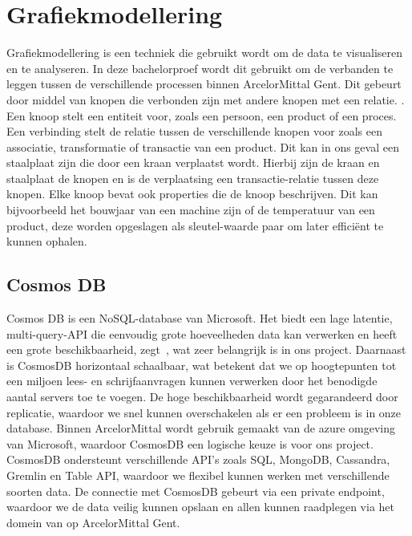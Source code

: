 \label{sec:grafiekmodellering}
\section{Grafiekmodellering}
Grafiekmodellering is een techniek die gebruikt wordt om de data te visualiseren en te analyseren. In deze bachelorproef wordt dit gebruikt om de verbanden te leggen tussen de verschillende processen binnen ArcelorMittal Gent.
Dit gebeurt door middel van knopen die verbonden zijn met andere knopen met een relatie. \autocite{neo4j20252}.
Een knoop stelt een entiteit voor, zoals een persoon, een product of een proces. Een verbinding stelt de relatie tussen de verschillende knopen voor zoals een associatie, transformatie of transactie van een product.
Dit kan in ons geval een staalplaat zijn die door een kraan verplaatst wordt. Hierbij zijn de kraan en staalplaat de knopen en is de verplaatsing een transactie-relatie tussen deze knopen.
Elke knoop bevat ook properties die de knoop beschrijven. Dit kan bijvoorbeeld het bouwjaar van een machine zijn of de temperatuur van een product, deze worden opgeslagen als sleutel-waarde paar om later efficiënt te kunnen ophalen.

\subsection{Cosmos DB}%
Cosmos DB is een NoSQL-database van Microsoft. Het biedt een lage latentie, multi-query-API die eenvoudig grote hoeveelheden data kan verwerken en heeft een grote beschikbaarheid, zegt~\textcite{Put2020}, wat zeer belangrijk is in ons project.
Daarnaast is CosmosDB horizontaal schaalbaar, wat betekent dat we op hoogtepunten tot een miljoen lees- en schrijfaanvragen kunnen verwerken door het benodigde aantal servers toe te voegen.
De hoge beschikbaarheid wordt gegarandeerd door replicatie, waardoor we snel kunnen overschakelen als er een probleem is in onze database.
Binnen ArcelorMittal wordt gebruik gemaakt van de azure omgeving van Microsoft, waardoor CosmosDB een logische keuze is voor ons project.
CosmosDB ondersteunt verschillende API's zoals SQL, MongoDB, Cassandra, Gremlin en Table API, waardoor we flexibel kunnen werken met verschillende soorten data.
De connectie met CosmosDB gebeurt via een private endpoint, waardoor we de data veilig kunnen opslaan en allen kunnen raadplegen via het domein van op ArcelorMittal Gent.

